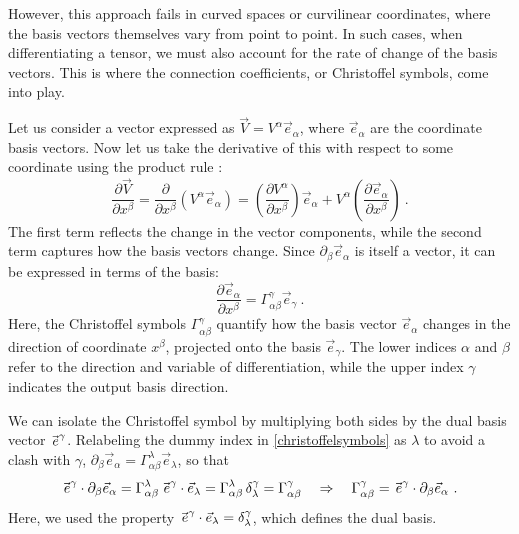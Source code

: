 However, this approach fails in curved spaces or curvilinear coordinates, where the basis vectors themselves vary from point to point. In such cases, when differentiating a tensor, we must also account for the rate of change of the basis vectors. This is where the connection coefficients, or Christoffel symbols, come into play.

Let us consider a vector expressed as $\vec{V} = V^\alpha \vec{e}_\alpha$, where $\vec{e}_\alpha$ are the coordinate basis vectors. Now let us take the derivative of this with respect to some coordinate using the product rule \cite{Llibre_Peter_Collier_unacosadificildecomprender}:
\begin{equation}
    \frac{\partial \vec{V}}{\partial x^\beta} 
= \frac{\partial}{\partial x^\beta} \left( V^\alpha \vec{e}_\alpha \right) 
= \left( \frac{\partial V^\alpha}{\partial x^\beta} \right) \vec{e}_\alpha 
+ V^\alpha \left( \frac{\partial \vec{e}_\alpha}{\partial x^\beta} \right) \ .
\label{vectorderivative}
\end{equation}
The first term reflects the change in the vector components, while the second term captures how the basis vectors change. Since $\partial_\beta \vec{e}_\alpha$ is itself a vector, it can be expressed in terms of the basis:
\begin{equation}
\frac{\partial \vec{e}_\alpha}{\partial x^\beta} = \Gamma^\gamma_{\alpha\beta} \vec{e}_\gamma \ .
\label{christoffelsymbols}
\end{equation}
Here, the Christoffel symbols $\Gamma^\gamma_{\alpha\beta}$ quantify how the basis vector $\vec{e}_\alpha$ changes in the direction of coordinate $x^\beta$, projected onto the basis $\vec{e}_\gamma$. The lower indices $\alpha$ and $\beta$ refer to the direction and variable of differentiation, while the upper index $\gamma$ indicates the output basis direction.


We can isolate the Christoffel symbol by multiplying both sides by the dual basis vector $\vec{\hspace{0.15em}e}^\gamma$. Relabeling the dummy index in \eqref{christoffelsymbols} as $\lambda$ to avoid a clash with $\gamma$, $\partial_\beta \vec{e}_\alpha = \Gamma^\lambda_{\alpha\beta} \vec{e}_\lambda$, so that
\begin{equation}
\vec{\hspace{0.15em}e}^\gamma \cdot \partial_\beta \vec{e}_\alpha
= \Gamma^\lambda_{\alpha \beta}\, \vec{\hspace{0.15em}e}^\gamma \cdot \vec{e}_\lambda
= \Gamma^\lambda_{\alpha\beta}\,\delta^\gamma_\lambda
= \Gamma^\gamma_{\alpha \beta}
\quad \Rightarrow \quad
\Gamma^\gamma_{\alpha \beta} = \vec{\hspace{0.15em}e}^\gamma \cdot \partial_\beta \vec{e}_\alpha \ .
\end{equation}
Here, we used the property $\vec{\hspace{0.15em}e}^\gamma \cdot \vec{e}_\lambda = \delta^\gamma_\lambda$, which defines the dual basis.


